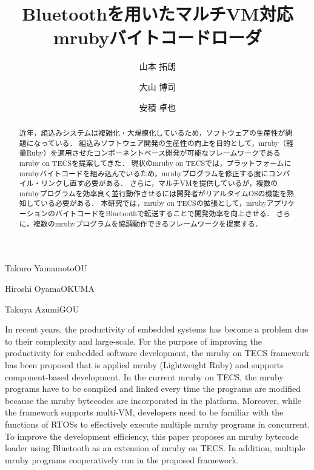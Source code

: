 \documentclass[submit,techrep]{ipsj}
\begin{document}
\title{Bluetoothを用いたマルチVM対応\\mrubyバイトコードローダ}





\author{山本 拓朗}{Takuro Yamamoto}{OU}%
\author{大山 博司}{Hiroshi Oyama}{OKUMA}%
\author{安積 卓也}{Takuya Azumi}{GOU}%

\begin{abstract}
近年，組込みシステムは複雑化・大規模化しているため，ソフトウェアの生産性が問題になっている．
組込みソフトウェア開発の生産性の向上を目的として，mruby（軽量Ruby）を適用させたコンポーネントベース開発が可能なフレームワークであるmruby on TECSを提案してきた．
現状のmruby on TECSでは，プラットフォームにmrubyバイトコードを組み込んでいるため，mrubyプログラムを修正する度にコンパイル・リンクし直す必要がある．
さらに，マルチVMを提供しているが，複数のmrubyプログラムを効率良く並行動作させるには開発者がリアルタイムOSの機能を熟知している必要がある．
本研究では，mruby on TECSの拡張として，mrubyアプリケーションのバイトコードをBluetoothで転送することで開発効率を向上させる．
さらに，複数のmrubyプログラムを協調動作できるフレームワークを提案する．
\vspace{-4mm}
\end{abstract}


\begin{eabstract}
In recent years, the productivity of embedded systems has become a problem due to their complexity and large-scale.
For the purpose of improving the productivity for embedded software development, the mruby on TECS framework has been proposed that is applied mruby (Lightweight Ruby) and supports component-based development.
In the current mruby on TECS, the mruby programs have to be compiled and linked every time the programs are modified because the mruby bytecodes are incorporated in the platform.
Moreover, while the framework supports multi-VM, developers need to be familiar with the functions of RTOSs to effectively execute multiple mruby programs in concurrent.
To improve the development efficiency, this paper proposes an mruby bytecode loader using Bluetooth as an extension of mruby on TECS.
In addition, multiple mruby programs cooperatively run in the proposed framework.
\vspace{-4mm}
\end{eabstract}
\end{document}
